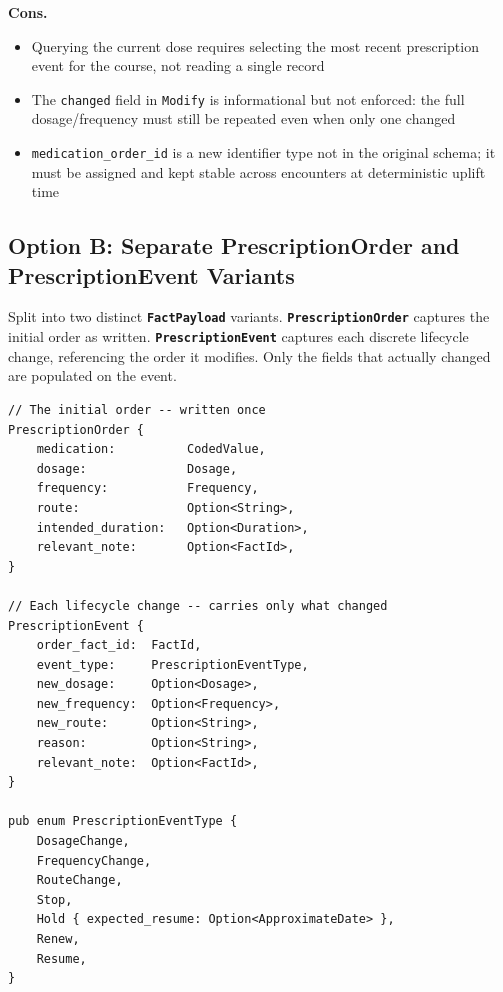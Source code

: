 \documentclass[11pt]{article}
\newcommand{\entity}[1]{\texttt{\textbf{#1}}}
\newcommand{\field}[1]{\texttt{#1}}
\newenvironment{consbox}{%
  \begin{mdframed}[backgroundcolor=warningyellow,
    linecolor=warningborder, linewidth=1pt,
    innertopmargin=8pt, innerbottommargin=8pt,
    innerleftmargin=10pt, innerrightmargin=10pt]
  \small
}{%
  \end{mdframed}
}
\begin{document}
\begin{consbox}
\textbf{Cons.}
\begin{itemize}[noitemsep]
  \item Querying the current dose requires selecting the most recent
    prescription event for the course, not reading a single record
  \item The \field{changed} field in \field{Modify} is informational
    but not enforced: the full dosage/frequency must still be repeated
    even when only one changed
  \item \field{medication\_order\_id} is a new identifier type not
    in the original schema; it must be assigned and kept stable across
    encounters at deterministic uplift time
\end{itemize}
\end{consbox}

\subsection{Option B: Separate PrescriptionOrder and PrescriptionEvent Variants}
\label{sec:option-b}

Split into two distinct \entity{FactPayload} variants.
\entity{PrescriptionOrder} captures the initial order as written.
\entity{PrescriptionEvent} captures each discrete lifecycle change,
referencing the order it modifies. Only the fields that actually
changed are populated on the event.

\begin{lstlisting}
// The initial order -- written once
PrescriptionOrder {
    medication:          CodedValue,
    dosage:              Dosage,
    frequency:           Frequency,
    route:               Option<String>,
    intended_duration:   Option<Duration>,
    relevant_note:       Option<FactId>,
}

// Each lifecycle change -- carries only what changed
PrescriptionEvent {
    order_fact_id:  FactId,
    event_type:     PrescriptionEventType,
    new_dosage:     Option<Dosage>,
    new_frequency:  Option<Frequency>,
    new_route:      Option<String>,
    reason:         Option<String>,
    relevant_note:  Option<FactId>,
}

pub enum PrescriptionEventType {
    DosageChange,
    FrequencyChange,
    RouteChange,
    Stop,
    Hold { expected_resume: Option<ApproximateDate> },
    Renew,
    Resume,
}
\end{lstlisting}
\end{document}
